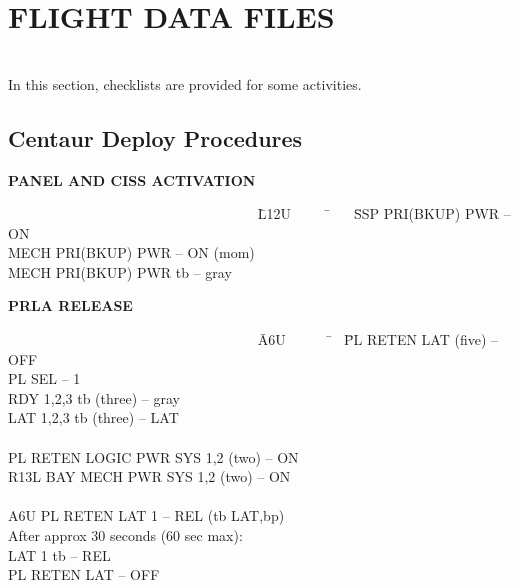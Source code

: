 \documentclass[Space_Shuttle_Vessel_Manual.tex]{subfiles}
\begin{document}
\section{FLIGHT DATA FILES}
\begin{multicols*}{2}
\label{sec:flight-data-files}
\renewcommand{\cfttoctitlefont}{\bf}
\localtableofcontents
\noindent
\\
In this section, checklists are provided for some activities.
\end{multicols*}

\subsection{Centaur Deploy Procedures}
{\fontsize{12pt}{14pt}\selectfont
\vspace{12pt}
\hspace{100pt}\textbf{PANEL AND CISS ACTIVATION}
\begin{tabbing}
~~~~~~~~~~~~~~~~~~~~~~~~~~~~~~~~~~~ \= L12U~~~~~ \= ~~ \= SSP PRI(BKUP) PWR -- ON\\
\>\>\> MECH PRI(BKUP) PWR -- ON (mom)\\
\>\>\> MECH PRI(BKUP) PWR tb -- gray\\
\end{tabbing}

\noindent
\hspace{100pt}\textbf{PRLA RELEASE}
\begin{tabbing}
~~~~~~~~~~~~~~~~~~~~~~~~~~~~~~~~~~~ \= A6U~~~~~~ \= ~ \= PL RETEN LAT (five) -- OFF\\
\>\>\> PL SEL -- 1\\
\>\>\> RDY 1,2,3 tb (three) -- gray\\
\>\>\> LAT 1,2,3 tb (three) -- LAT\\\\

\>\>\> PL RETEN LOGIC PWR SYS 1,2 (two) -- ON\\
\>R13L\>\> BAY MECH PWR SYS 1,2 (two) -- ON\\\\

\>A6U\>\> PL RETEN LAT 1 -- REL (tb LAT,bp)\\
\>\>\> After approx 30 seconds (60 sec max):\\
\>\>\> LAT 1 tb -- REL\\
\>\>\> PL RETEN LAT  -- OFF\\\\


\end{tabbing}}
\end{document}
